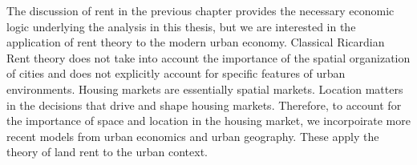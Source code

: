 




The discussion of rent in the previous chapter provides the necessary economic logic
underlying the analysis in this thesis, but we are interested in the application of rent theory to the modern urban economy. Classical Ricardian Rent theory does not take into account the importance of the spatial organization of cities and does not explicitly account for specific features of urban environments. Housing markets are essentially spatial markets. Location matters in the decisions that drive and shape housing markets. Therefore, to account for the importance of space and location in the housing market, we incorpoirate  more recent models from urban economics and urban geography. These apply the theory of land rent to the urban context.

